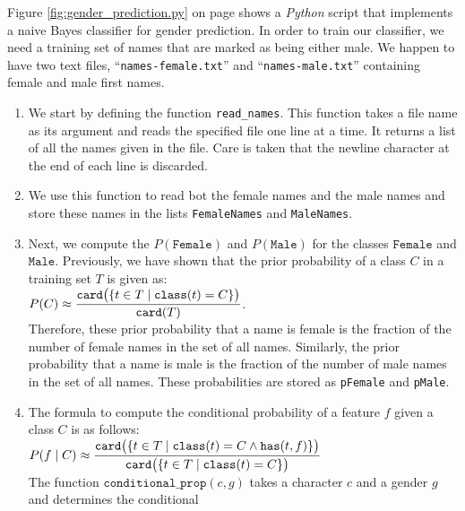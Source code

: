Figure \ref{fig:gender_prediction.py} on page \pageref{fig:gender_prediction.py} shows a \textsl{Python} script
that implements a naive Bayes classifier for gender prediction.   In order to train our classifier, we need a
training set of names that are marked as being either male. We happen to have two text files, ``\texttt{names-female.txt}''
and ``\texttt{names-male.txt}'' containing female and male first names.
\begin{enumerate}
\item We start by defining the function \texttt{read\_names}. This
      function takes a file name as its argument and reads the specified file one line at a time.  It returns a
      list of all the names given in the file. Care is taken that the newline character at the end of each line
      is discarded. 
\item We use this function to read bot the female names and the male names and store these names in the lists
      \texttt{FemaleNames} and \texttt{MaleNames}.
\item Next, we compute the  $P(\texttt{Female})$ and $P(\texttt{Male})$ for the classes
      $\texttt{Female}$ and $\texttt{Male}$.  Previously, we have shown that the prior probability of a class $C$
      in a training set $T$ is given as: 
      \\[0.2cm]
      \hspace*{1.3cm}
      $\displaystyle P(C) \approx  \frac{\texttt{card}\bigl(\{t \in T \;|\; \texttt{class}(t) = C \}\bigr)}{\texttt{card}(T)}$.
      \\[0.2cm]
      Therefore, these prior probability that a name is female is the fraction of the number of female names in
      the set of all names.  Similarly, the prior probability that a name is male is the fraction of the number
      of male names in  the set of all names.  These probabilities are stored as \texttt{pFemale} and \texttt{pMale}.
\item The formula to compute the conditional probability of a feature $f$ given a class $C$ is as follows:
      \\[0.2cm]
      \hspace*{1.3cm}
      $\displaystyle P(f\;|\;C) \approx 
         \frac{\texttt{card}\bigl(\{t \in T \;|\; \texttt{class}(t) = C \wedge \texttt{has}(t, f) \}\bigr)}{
         \texttt{card}\bigl(\{t \in T \;|\; \texttt{class}(t) = C \}\bigr)} 
      $
      \\[0.2cm]
      The function $\texttt{conditional\_prop}(c,g)$ takes a character $c$ and a gender $g$ and determines the conditional

\end{enumerate}
